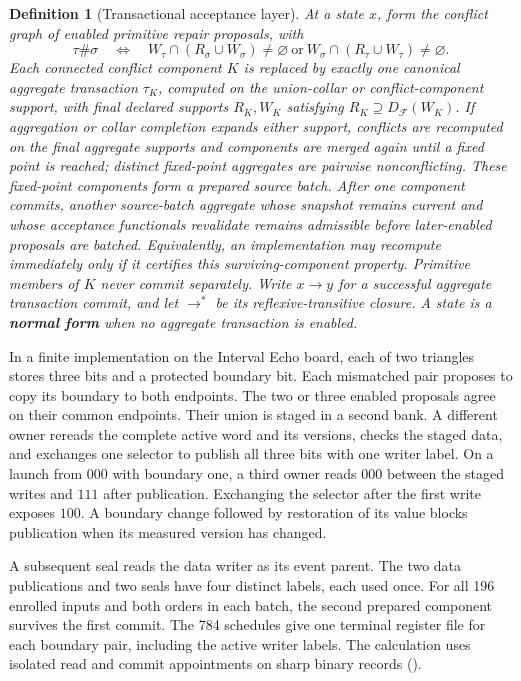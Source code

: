 \documentclass[11pt]{article}
\newtheorem{definition}[theorem]{Definition}
\theoremstyle{remark}
\theoremstyle{plain}
\begin{document}
\begin{definition}[Transactional acceptance layer]
At a state \(x\), form the conflict graph of enabled primitive repair proposals, with
\[
\tau\#\sigma
\quad\Longleftrightarrow\quad
W_\tau\cap(R_\sigma\cup W_\sigma)\ne\varnothing
\ \text{or}\
W_\sigma\cap(R_\tau\cup W_\tau)\ne\varnothing .
\]
Each connected conflict component \(K\) is replaced by exactly one canonical aggregate transaction
\(\tau_K\), computed on the union-collar or conflict-component support, with final declared
supports \(R_K,W_K\) satisfying \(R_K\supseteq D_{\mathcal F}(W_K)\).
If aggregation or collar completion expands either support, conflicts are recomputed on the
final aggregate supports and components are merged again until a fixed point is reached; distinct
fixed-point aggregates are pairwise nonconflicting.  These fixed-point components form a prepared
source batch.  After one component commits, another source-batch aggregate whose snapshot remains
current and whose acceptance functionals revalidate remains admissible before later-enabled
proposals are batched.  Equivalently, an implementation may recompute immediately only if it
certifies this surviving-component property.  Primitive members of \(K\) never commit separately.
Write \(x\to y\) for a successful aggregate transaction commit, and
let \(\to^*\) be its reflexive-transitive closure. A state is a \textbf{normal form} when no
aggregate transaction is enabled.
\end{definition}

In a finite implementation on the Interval Echo board, each of two
triangles stores three bits and a protected boundary bit. Each mismatched
pair proposes to copy its boundary to both endpoints. The two or three
enabled proposals agree on their common endpoints. Their union is staged
in a second bank. A different owner rereads the complete active word and
its versions, checks the staged data, and exchanges one selector to
publish all three bits with one writer label. On a launch from $000$ with
boundary one, a third owner reads $000$ between the staged writes and
$111$ after publication. Exchanging the selector after the first write
exposes $100$. A boundary change followed by restoration of its value
blocks publication when its measured version has changed.

A subsequent seal reads the data writer as its event parent. The two data
publications and two seals have four distinct labels, each used once. For
all 196 enrolled inputs and both orders in each batch, the second
prepared component survives the first commit. The 784 schedules give one
terminal register file for each boundary pair, including the active
writer labels. The calculation uses isolated read and commit appointments
on sharp binary records
().
\end{document}
